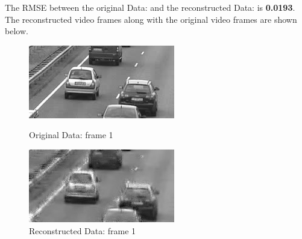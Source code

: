 \documentclass[12pt]{article}
\begin{document}
\begin{itemize}
\begin{enumerate}
    The RMSE between the original Data: and the reconstructed Data: is \textbf{0.0193}. \\
    The reconstructed video frames along with the original video frames are shown below.
    
    
    
    \begin{figure}[H]
        \centering
        \begin{minipage}{.45\textwidth}
            \centering
            \includegraphics[width=\linewidth]{results/cars_5_orig_1.png}
            \caption*{Original Data: frame 1}
        \end{minipage}
        \begin{minipage}{.45\textwidth}
            \centering
            \includegraphics[width=\linewidth]{results/cars_5_recon_1.png}
            \caption*{Reconstructed Data: frame 1}
        \end{minipage}
    \end{figure}
    

\end{enumerate}
\end{itemize}
\end{document}
